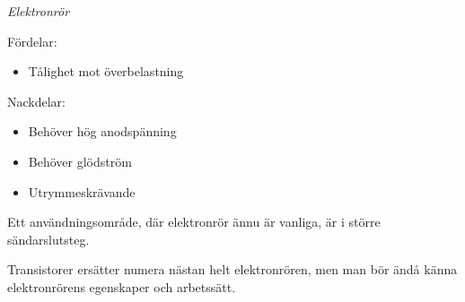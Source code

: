 \emph{Elektronrör}

Fördelar:
\begin{itemize}
\item Tålighet mot överbelastning
\end{itemize}

Nackdelar:
\begin{itemize}
\item Behöver hög anodspänning
\item Behöver glödström
\item Utrymmeskrävande
\end{itemize}

Ett användningsområde, där elektronrör ännu är vanliga, är i större
sändarslutsteg.

Transistorer ersätter numera nästan helt elektronrören, men man bör ändå känna
elektronrörens egenskaper och arbetssätt.
